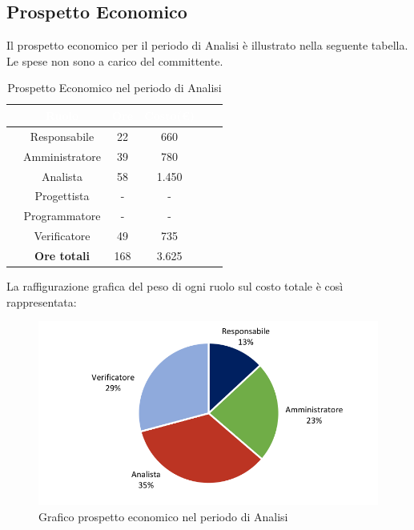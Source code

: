 \subsection{Prospetto Economico}
Il prospetto economico per il periodo di Analisi è illustrato nella seguente tabella.
Le spese non sono a carico del committente.

\begin{table}[ht]
	\begin{center}
			\begin{tabular}{cccccc}
			\rowcolor{coolblack}
			\hline
			&\textcolor{white}{Ruolo}&	\textcolor{white}{Ore} &\textcolor{white}{Costo(\euro)} \\
			\hline
			&Responsabile           &22& 660  \\
			&Amministratore        & 39& 780 \\
			&Analista                   & 58& 1.450 \\
			&Progettista              &  -& - \\
			&Programmatore       & - & -  \\
			&Verificatore             & 49 & 735 \\
			\hline
			&\textbf{Ore totali}    &168& 3.625 \\
		\end{tabular}
		\caption{Prospetto Economico nel periodo di Analisi}
	\end{center}
\end{table}

La raffigurazione grafica del peso di ogni ruolo sul costo totale è così rappresentata:
\begin{figure}[!ht]
	\centering
	\includegraphics{images/grafoProspettoEconomico.png}
	\caption{Grafico prospetto economico nel periodo di Analisi }
\end{figure}

